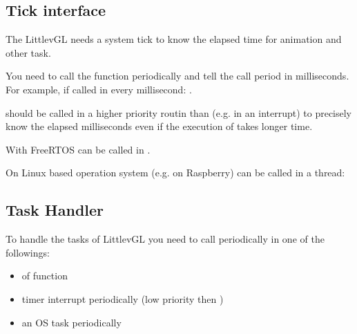 \documentclass[letterpaper,10pt,english]{sphinxmanual}
\begin{document}
\subsection{Tick interface}
\label{\detokenize{porting/tick:tick-interface}}\label{\detokenize{porting/tick::doc}}
The LittlevGL needs a system tick to know the elapsed time for animation and other task.

You need to call the  function periodically and tell the call period in milliseconds. For example, if called in every millisecond: .

 should be called in a higher priority routin than (e.g. in an interrupt) to precisely know the elapsed milliseconds even if the execution of  takes longer time.

With FreeRTOS  can be called in .

On Linux based operation system (e.g. on Raspberry)  can be called in a thread:

\begin{sphinxVerbatim}[commandchars=\\\{\}]
    
       
           
              
\end{sphinxVerbatim}


\subsection{Task Handler}
\label{\detokenize{porting/task-handler:task-handler}}\label{\detokenize{porting/task-handler::doc}}
To handle the tasks of LittlevGL you need to call  periodically in one of the followings:
\begin{itemize}
\item {} 
 of  function

\item {} 
timer interrupt periodically (low priority then )

\item {} 
an OS task periodically

\end{itemize}
\end{document}
